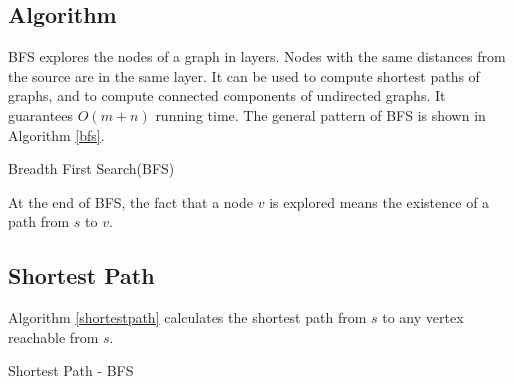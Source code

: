 \subsection{Algorithm}
BFS explores the nodes of a graph in layers. Nodes with the same distances from the source are in the same layer. It can be used to compute shortest paths of graphs, and to compute connected components of undirected graphs. It guarantees $O(m+n)$ running time. The general pattern of BFS is shown in Algorithm \ref{bfs}.
\begin{algorithm}[ht]
\caption{Breadth First Search(BFS)}\label{bfs}
\begin{algorithmic}[1]
\Input{}
\Output{}
\EndIf
\EndFor
\EndWhile 
\end{algorithmic}
\end{algorithm}

At the end of BFS, the fact that a node $v$ is explored means the existence of a path from $s$ to $v$. 
\subsection{Shortest Path}
Algorithm \ref{shortestpath} calculates the shortest path from $s$ to any vertex reachable from $s$.
\begin{algorithm}[ht]
\caption{Shortest Path - BFS}\label{shortestpath}
\begin{algorithmic}[1]
\Input{}
\Output{}
\EndIf
\EndFor
\EndWhile 
\end{algorithmic}
\end{algorithm}


